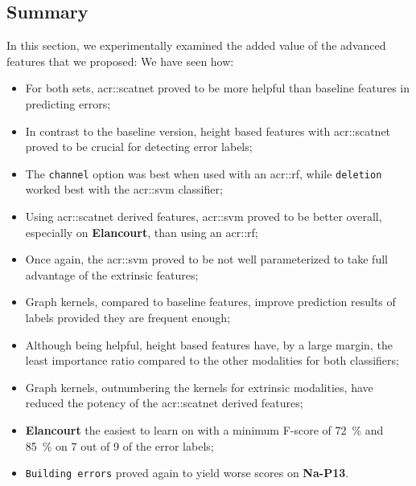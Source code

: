     \subsection{Summary}
        \label{subsec::more_experiments::richer_features::summary}
        In this section, we experimentally examined the added value of the advanced features that we proposed:
        We have seen how:
        \begin{itemize}[label=\(\blacktriangleright\)]
            \item For both sets, \gls{acr::scatnet} proved to be more helpful than baseline features in predicting errors; 
            \item In contrast to the baseline version, height based features with \gls{acr::scatnet} proved to be crucial for detecting error labels;
            \item The \texttt{channel} option was best when used with an \gls{acr::rf}, while \texttt{deletion} worked best with the \gls{acr::svm} classifier;
            \item Using \gls{acr::scatnet} derived features, \gls{acr::svm} proved to be better overall, especially on \textbf{Elancourt}, than using an \gls{acr::rf};
            \item Once again, the \gls{acr::svm} proved to be not well parameterized to take full advantage of the extrinsic features;
            \item Graph kernels, compared to baseline features, improve prediction results of labels provided they are frequent enough;
            \item Although being helpful, height based features have, by a large margin, the least importance ratio compared to the other modalities for both classifiers;
            \item Graph kernels, outnumbering the kernels for extrinsic modalities, have reduced the potency of the \gls{acr::scatnet} derived features;
            \item \textbf{Elancourt} the easiest to learn on with a minimum F-score of \SI{72}{\percent} and \SI{85}{\percent} on 7 out of 9 of the error labels;
            \item \texttt{Building errors} proved again to yield worse scores on \textbf{Na-P13}.
        \end{itemize}

